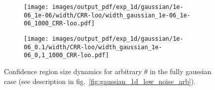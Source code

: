 \documentclass[a4paper,14pt]{extarticle}
\begin{document}
\begin{figure}
\begin{subfigure}[b]{0.25\linewidth}
    \caption{} \label{fig:gaussian_1d_low_noise_width_arb_c2}
  \end{subfigure}%
  \begin{subfigure}[b]{0.25\linewidth}
    \texttt{[image: images/output\_pdf/exp\_1d/gaussian/1e-06\_1e-06/width/CRR-loo/width\_gaussian\_1e-06\_1e-06\_1000\_CRR-loo.pdf]}
    \caption{} \label{fig:gaussian_1d_low_noise_width_arb_c3}
  \end{subfigure}%
  \begin{subfigure}[b]{0.25\linewidth}
    \texttt{[image: images/output\_pdf/exp\_1d/gaussian/1e-06\_0.1/width/CRR-loo/width\_gaussian\_1e-06\_0,1\_1000\_CRR-loo.pdf]}
    \caption{} \label{fig:gaussian_1d_low_noise_width_arb_c4}
  \end{subfigure}%
  \caption{Confidence region size dynamics for arbitrary $\theta$ in the fully gaussian
  case (see description in fig.~\ref{fig:gaussian_1d_low_noise_arb}).}
  \label{fig:gaussian_1d_low_noise_width_arb}
\end{figure}
\end{document}
